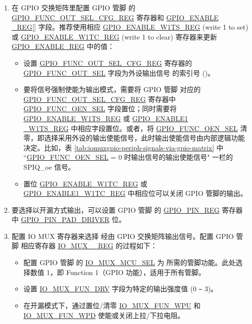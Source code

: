 \documentclass[main\_\_CN.tex]{subfiles}
\begin{document}
\begin{enumerate}
    \item 在 GPIO 交换矩阵里配置 GPIO 管脚  的 \hyperref[regdesc:GPIOFUNCNOUTSELCFGREG]{GPIO\_FUNC\_OUT\_SEL\_CFG\_REG} 寄存器和 \hyperref[regdesc:GPIOENABLEREG]{GPIO\_ENABLE\\\_REG}[] 字段。推荐使用相应 \hyperref[regdesc:GPIOENABLEW1TSREG]{GPIO\_ENABLE\_W1TS\_REG} (write 1 to set) 或 \hyperref[regdesc:GPIOENABLEW1TCREG]{GPIO\_ENABLE\_W1TC\_REG} (write 1 to clear) 寄存器来更新 \hyperref[regdesc:GPIOENABLEREG]{GPIO\_ENABLE\_REG} 中的值：
    \begin{itemize}
        \item 设置 \hyperref[regdesc:GPIOFUNCNOUTSELCFGREG]{GPIO\_FUNC\_OUT\_SEL\_CFG\_REG} 寄存器的 \hyperref[fielddesc:GPIOFUNCNOUTSEL]{GPIO\_FUNC\_OUT\_SEL} 字段为外设输出信号  的索引号 ()。
        \item 要将信号强制使能为输出模式，需要将 GPIO 管脚  对应的 \hyperref[regdesc:GPIOFUNCNOUTSELCFGREG]{GPIO\_FUNC\_OUT\_SEL\_CFG\_REG} 寄存器中 \hyperref[fielddesc:GPIOFUNCNOENSEL]{GPIO\_FUNC\_OEN\_SEL} 字段置位；同时需要将 \hyperref[regdesc:GPIOENABLEW1TSREG]{GPIO\_ENABLE\_W1TS\_REG} 或 \hyperref[regdesc:GPIOENABLE1W1TSREG]{GPIO\_ENABLE1\\\_W1TS\_REG} 中相应字段置位。或者，将 \hyperref[fielddesc:GPIOFUNCNOENSEL]{GPIO\_FUNC\_OEN\_SEL} 清零，即选择采用外设的输出使能信号，此时输出使能信号由内部逻辑功能决定。比如，表 \ref{tab:iomuxgpio-periph-signals-via-gpio-matrix} 中 ``\hyperref[fielddesc:GPIOFUNCNOENSEL]{GPIO\_FUNC\_OEN\_SEL} = 0 时输出信号的输出使能信号" 一栏的 SPIQ\_oe 信号。
        \item 置位 \hyperref[regdesc:GPIOENABLEW1TCREG]{GPIO\_ENABLE\_W1TC\_REG} 或 \hyperref[regdesc:GPIOENABLE1W1TCREG]{GPIO\_ENABLE1\_W1TC\_REG} 中相应位可以关闭 GPIO 管脚的输出。
    \end{itemize}
    \item 要选择以开漏方式输出，可以设置 GPIO 管脚  的 \hyperref[regdesc:GPIOPINNREG]{GPIO\_PIN\_REG} 寄存器中 \hyperref[fielddesc:GPIOPINNPADDRIVER]{GPIO\_PIN\_PAD\_DRIVER} 位。
    \item 配置 IO MUX 寄存器来选择 经由 GPIO 交换矩阵输出信号。配置 GPIO 管脚  相应寄存器 \hyperref[regdesc:IOMUXnREG]{IO\_MUX\_\_REG} 的过程如下：
    \begin{itemize}
        \item 配置 GPIO 管脚  的 \hyperref[fielddesc:IOMUXMCUSEL]{IO\_MUX\_MCU\_SEL} 为 所需的管脚功能。此处选择数值 1，即 Function 1（GPIO 功能），适用于所有管脚。
        \item 设置 \hyperref[fielddesc:IOMUXFUNDRV]{IO\_MUX\_FUN\_DRV} 字段为特定的输出强度值 (0 \verb+~+ 3)。
        \item 在开漏模式下，通过置位/清零 \hyperref[fielddesc:IOMUXFUNWPU]{IO\_MUX\_FUN\_WPU} 和 \hyperref[fielddesc:IOMUXFUNWPD]{IO\_MUX\_FUN\_WPD} 使能或关闭上拉/下拉电阻。
    \end{itemize}
\end{enumerate}
\end{document}
